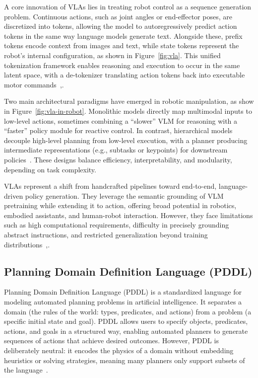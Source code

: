 \documentclass[12pt]{extarticle}
\begin{document}
A core innovation of VLAs lies in treating robot control as a sequence generation problem. Continuous actions, such as joint angles or end-effector poses, are discretized into tokens, allowing the model to autoregressively predict action tokens in the same way language models generate text. Alongside these, prefix tokens encode context from images and text, while state tokens represent the robot’s internal configuration, as shown in Figure~\ref{fig:vla}. This unified tokenization framework enables reasoning and execution to occur in the same latent space, with a de-tokenizer translating action tokens back into executable motor commands~\cite{vla},\cite{vla-in-robot}.

Two main architectural paradigms have emerged in robotic manipulation, as show in Figure~\ref{fig:vla-in-robot}. Monolithic models directly map multimodal inputs to low-level actions, sometimes combining a “slower” VLM for reasoning with a “faster” policy module for reactive control. In contrast, hierarchical models decouple high-level planning from low-level execution, with a planner producing intermediate representations (e.g., subtasks or keypoints) for downstream policies~\cite{vla-in-robot}. These designs balance efficiency, interpretability, and modularity, depending on task complexity.

VLAs represent a shift from handcrafted pipelines toward end-to-end, language-driven policy generation. They leverage the semantic grounding of VLM pretraining while extending it to action, offering broad potential in robotics, embodied assistants, and human-robot interaction. However, they face limitations such as high computational requirements, difficulty in precisely grounding abstract instructions, and restricted generalization beyond training distributions~\cite{vla},\cite{vla-in-robot}.

\subsection{Planning Domain Definition Language (PDDL)}
\label{sec: pddl}
Planning Domain Definition Language (PDDL) is a standardized language for modeling automated planning problems in artificial intelligence. It separates a domain (the rules of the world: types, predicates, and actions) from a problem (a specific initial state and goal). PDDL allows users to specify objects, predicates, actions, and goals in a structured way, enabling automated planners to generate sequences of actions that achieve desired outcomes. However, PDDL is deliberately neutral: it encodes the physics of a domain without embedding heuristics or solving strategies, meaning many planners only support subsets of the language~\cite{pddl-1.2}.
\end{document}
